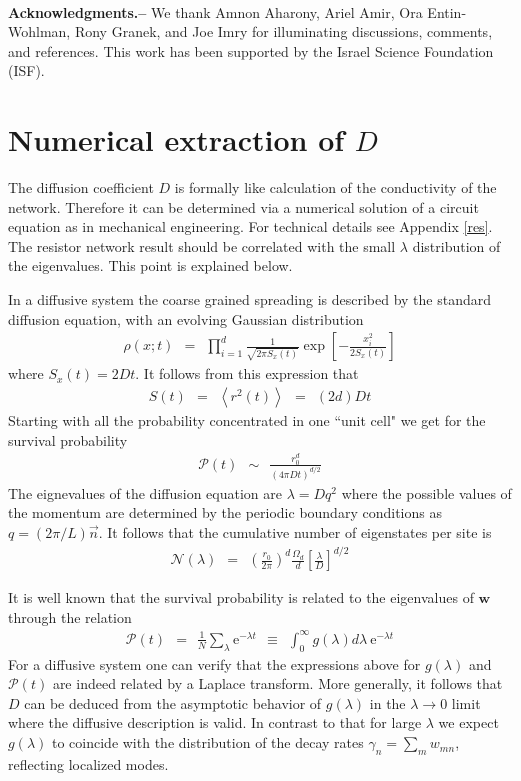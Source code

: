 \documentclass[aps,prb,floats,floatfix,twocolumn]{revtex4}
\newcommand{\eexp}{\mbox{e}^}
\newcommand{\beq}{\begin{eqnarray}}
\newcommand{\eeq}{\end{eqnarray}}
\begin{document}
\ \\

{\bf Acknowledgments.-- }
We thank Amnon Aharony, Ariel Amir, Ora Entin-Wohlman, Rony Granek, and Joe Imry 
for illuminating discussions, comments, and references. 
This work has been supported by the Israel Science Foundation (ISF). 



\appendix


\section{Numerical extraction of $D$}
\label{diff}

The diffusion coefficient $D$ is formally like calculation 
of the conductivity of the network. Therefore it can be determined 
via a numerical solution of a circuit equation  
as in mechanical engineering.  
For technical details see Appendix \ref{res}. 
%
The resistor network result should be correlated 
with the small $\lambda$ distribution of the eigenvalues.
This point is explained below.

In a diffusive system the coarse grained spreading 
is described by the standard diffusion equation,
with an evolving Gaussian distribution  
%  
\beq
\rho(x;t) \ \ = \ \ \prod_{i=1}^d \frac{1}{\sqrt{2\pi S_x(t)}} 
\exp\left[-\frac{x_i^2}{2S_x(t)} \right]
\eeq
%
where $S_x(t)=2Dt$. It follows from this expression that 
% 
\beq
S(t) \ \ = \ \ \left\langle r^2(t) \right\rangle  \ \ = \ \ (2d)Dt
\eeq
%
Starting with all the probability concentrated 
in one ``unit cell" we get for the survival probability 
%
\beq
\mathcal{P}(t) \ \ \sim \ \ \frac{r_0^d}{\left({4\pi D t}\right)^{d/2}} 
\eeq
%
The eignevalues of the diffusion equation are $\lambda=Dq^2$ 
where the possible values of the momentum are determined  
by the periodic boundary conditions as $q=(2\pi/L)\vec{n}$. 
It follows that the cumulative number of eigenstates 
per site is  
%
\beq 
\mathcal{N}(\lambda) \ \ = \ \ 
\left(\frac{r_0}{2\pi}\right)^d
\frac{\Omega_d}{d}
\left[\frac{\lambda}{D}\right]^{d/2}
\eeq


It is well known that the survival probability 
is related to the eigenvalues of $\bm{w}$ through the relation
%
\beq 
\mathcal{P}(t) \ \ = \ \ \frac{1}{N}\sum_\lambda \eexp{-\lambda t} 
\ \ \equiv \ \ \int_0^{\infty} g(\lambda)d\lambda \ \eexp{-\lambda t}
\eeq
%
For a diffusive system one can verify that 
the expressions above for $g(\lambda)$ and $\mathcal{P}(t)$ 
are indeed related by a Laplace transform.  
%
More generally, it follows that $D$ can be deduced from 
the asymptotic behavior of $g(\lambda)$
in the ${\lambda\rightarrow 0}$ limit  
where the diffusive description is valid.
%
In contrast to that for large $\lambda$ we expect $g(\lambda)$ to coincide 
with the distribution of the decay rates $\gamma_n=\sum_{m}w_{mn}$, 
reflecting localized modes.
\end{document}
